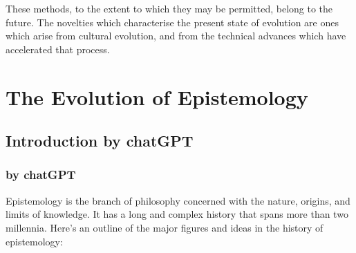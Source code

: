 \documentclass[10pt,titlepage]{book}
\begin{document}
These methods, to the extent to which they may be permitted,  belong to the future.
The novelties which characterise the present state of evolution are ones which arise from cultural evolution, and from the technical advances which have accelerated that process.


\part{The Evolution of Epistemology}

\chapter{Introduction by chatGPT}

\section{by chatGPT}

Epistemology is the branch of philosophy concerned with the nature, origins, and limits of knowledge. It has a long and complex history that spans more than two millennia. Here's an outline of the major figures and ideas in the history of epistemology:
\end{document}
